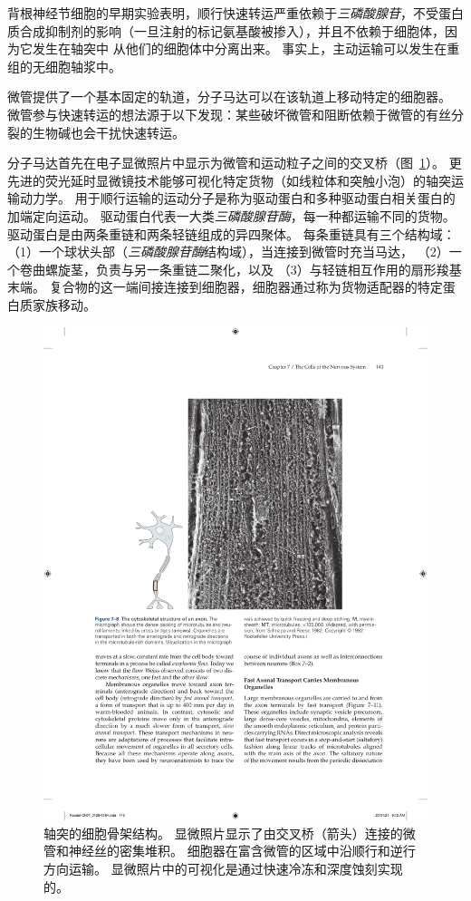 背根神经节细胞的早期实验表明，顺行快速转运严重依赖于\textit{三磷酸腺苷}，不受蛋白质合成抑制剂的影响（一旦注射的标记氨基酸被掺入），并且不依赖于细胞体，因为它发生在轴突中 从他们的细胞体中分离出来。
事实上，主动运输可以发生在重组的无细胞轴浆中。


微管提供了一个基本固定的轨道，分子马达可以在该轨道上移动特定的细胞器。
微管参与快速转运的想法源于以下发现：某些破坏微管和阻断依赖于微管的有丝分裂的生物碱也会干扰快速转运。


分子马达首先在电子显微照片中显示为微管和运动粒子之间的交叉桥（图~\ref{fig:7_8}）。
更先进的荧光延时显微镜技术能够可视化特定货物（如线粒体和突触小泡）的轴突运输动力学。
用于顺行运输的运动分子是称为驱动蛋白和多种驱动蛋白相关蛋白的加端定向运动。
驱动蛋白代表一大类\textit{三磷酸腺苷酶}，每一种都运输不同的货物。
驱动蛋白是由两条重链和两条轻链组成的异四聚体。
每条重链具有三个结构域：
（1）一个球状头部（\textit{三磷酸腺苷酶}结构域），当连接到微管时充当马达，
（2）一个卷曲螺旋茎，负责与另一条重链二聚化，以及
（3）与轻链相互作用的扇形羧基末端。
复合物的这一端间接连接到细胞器，细胞器通过称为货物适配器的特定蛋白质家族移动。


\begin{figure}[htbp]
	\centering
	\includegraphics[width=1.0\linewidth]{chap07/fig_7_8}
	\caption{轴突的细胞骨架结构。
		显微照片显示了由交叉桥（箭头）连接的微管和神经丝的密集堆积。
		细胞器在富含微管的区域中沿顺行和逆行方向运输。
		显微照片中的可视化是通过快速冷冻和深度蚀刻实现的\cite{schnapp1982cytoplasmic}。}
	\label{fig:7_8}
\end{figure}


